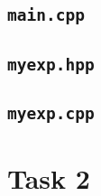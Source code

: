 \documentclass[12pt]{article}
\begin{document}
\subsection*{\texttt{main.cpp}}

\subsection*{\texttt{myexp.hpp}}

\subsection*{\texttt{myexp.cpp}}

\newpage

\section{Task 2}
\end{document}
